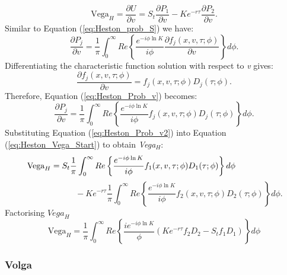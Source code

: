 \documentclass[a4paper]{article}
\begin{document}
\begin{equation}
	\mbox{Vega}_H = \frac{\partial U}{\partial v} = S_t\frac{\partial P_1}{\partial v} - Ke^{-r\tau} \frac{\partial P_2}{\partial v}.
	\label{eq:Heston_Vega_Start}
\end{equation}
Similar to Equation (\ref{eq:Heston_prob_S}) we have:
\begin{equation}
	\frac{\partial P_j}{\partial v} = \frac{1}{\pi}\int_0^{\infty} Re \left\{ \frac{e^{-i\phi \ln K}}{i\phi} \frac{\partial f_j(x,v,\tau;\phi)}{\partial v} \right\} d\phi.
	\label{eq:Heston_Prob_v} 
\end{equation} 
Differentiating the characteristic function solution with respect to \textit{v} gives:
\begin{equation}
	\frac{\partial f_j(x,v,\tau;\phi)}{\partial v} = f_j(x,v,\tau;\phi) D_j(\tau;\phi).
	\label{eq:Heston_dfdv}
\end{equation}
Therefore, Equation (\ref{eq:Heston_Prob_v}) becomes:
\begin{equation}
	\frac{\partial P_j}{\partial v} = \frac{1}{\pi}\int_0^{\infty} Re \left\{ \frac{e^{-i\phi \ln K}}{i\phi} f_j(x,v,\tau;\phi)D_j(\tau;\phi) \right\} d\phi. 
	\label{eq:Heston_Prob_v2}
\end{equation}
Substituting Equation (\ref{eq:Heston_Prob_v2}) into Equation (\ref{eq:Heston_Vega_Start}) to obtain \textit{Vega$_H$}:
\begin{equation*}
	\hspace{-55pt} \mbox{Vega}_H =S_t\frac{1}{\pi}\int_0^{\infty} Re \left\{ \frac{e^{-i\phi \ln K}}{i\phi} f_1(x,v,\tau;\phi)D_1(\tau;\phi) \right\} d\phi
\end{equation*}
\begin{equation}
	\quad \quad \quad \quad \quad \quad - Ke^{-r\tau}\frac{1}{\pi}\int_0^{\infty} Re \left\{ \frac{e^{-i\phi \ln K}}{i\phi} f_2(x,v,\tau;\phi)D_2(\tau;\phi) \right\} d\phi.
	\label{eq:Heston_Vega}
\end{equation}
Factorising $\textit{Vega}_H$
\begin{equation}
	\mbox{Vega}_H = \frac{1}{\pi}\int_0^\infty Re \left\{ \frac{ie^{-i\phi \ln K}}{\phi} \left(   Ke^{-r\tau}f_2D_2-S_tf_1D_1 \right) \right\} d\phi
	\label{eq:Heston_Vega_Fact}
\end{equation}

\subsubsection*{Volga}
\end{document}
